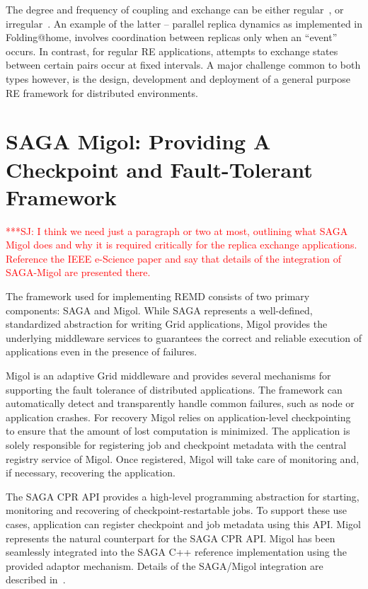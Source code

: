 \documentclass{rspublic}
\newcommand{\jhanote}[1]{ {\textcolor{red} { ***SJ: #1 }}}
\newcommand{\jhanote}[1]{}
\begin{document}
The degree and frequency of coupling and exchange can be either
regular~\citep{hansmann,Sugita:1999rm}, or
irregular~\citep{SPdynamics,pande_bj03}. An example of the latter --
parallel replica dynamics as implemented in Folding@home, involves
coordination between replicas only when an ``event'' occurs.  In
contrast, for regular RE applications, attempts to exchange states
between certain pairs occur at fixed intervals. A major challenge
common to both types however, is the design, development and
deployment of a general purpose RE framework for distributed
environments.

\section{SAGA Migol: Providing A Checkpoint and Fault-Tolerant
  Framework}\label{sec:sagamigol}

\jhanote{I think we need just a paragraph or two at most, outlining
  what SAGA Migol does and why it is required critically for the
  replica exchange applications. Reference the IEEE e-Science paper
  and say that details of the integration of SAGA-Migol are presented
  there.}

The framework used for implementing REMD consists of two  primary components: SAGA and Migol.     
While SAGA represents a well-defined, standardized abstraction for writing Grid applications,
Migol provides the underlying middleware services to guarantees the correct and reliable exe\-cution of applications
even in the presence of failures.
    

Migol is an  adaptive Grid middleware and provides several mechanisms for supporting the fault tolerance
of distributed applications. The framework can automatically detect and transparently handle common failures, 
such as node or application crashes. For recovery Migol relies on application-level checkpointing 
to ensure that the amount of lost computation is minimized. The 
application is solely responsible for registering job and checkpoint metadata with the central registry service
of Migol. Once registered, Migol will take care of monitoring and, if necessary, recovering the application.

The SAGA CPR API provides a high-level programming abstraction for starting, monitoring and recovering
of checkpoint-restartable jobs. To support these use cases, application can register
checkpoint and job metadata using this API. Migol represents the natural counterpart
for the SAGA CPR API. Migol has been seamlessly integrated into the SAGA C++ reference implementation
using the provided adaptor mechanism. Details of the SAGA/Migol integration are described in~\citet{Luckow:2008la}.
\end{document}
